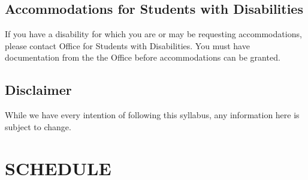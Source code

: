 \documentclass[12pt]{article}
\begin{document}
\subsection*{Accommodations for Students with Disabilities}
If you have a disability for which you are or may be requesting accommodations, please contact Office for Students with Disabilities.  You must have documentation from the the Office before accommodations can be granted.
\subsection*{Disclaimer}
While we have every intention of following this syllabus, any information here is subject to change. 

\pagebreak
\section*{SCHEDULE}
\end{document}
